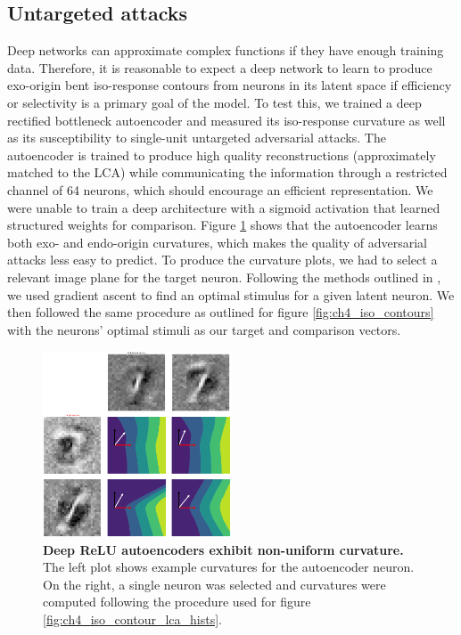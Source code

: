 \subsection{Untargeted attacks}\label{sec:ch4_deep_relu_comparisons}
Deep networks can approximate complex functions if they have enough training data. Therefore, it is reasonable to expect a deep network to learn to produce exo-origin bent iso-response contours from neurons in its latent space if efficiency or selectivity is a primary goal of the model. To test this, we trained a deep rectified bottleneck autoencoder and measured its iso-response curvature as well as its susceptibility to single-unit untargeted adversarial attacks. The autoencoder is trained to produce high quality reconstructions (approximately matched to the LCA) while communicating the information through a restricted channel of 64 neurons, which should encourage an efficient representation. We were unable to train a deep architecture with a sigmoid activation that learned structured weights for comparison. Figure \ref{fig:ch4_drae_curvature} shows that the autoencoder learns both exo- and endo-origin curvatures, which makes the quality of adversarial attacks less easy to predict. To produce the curvature plots, we had to select a relevant image plane for the target neuron. Following the methods outlined in \parencite{mahendran2016visualizing}, we used gradient ascent to find an optimal stimulus for a given latent neuron. We then followed the same procedure as outlined for figure \ref{fig:ch4_iso_contours} with the neurons' optimal stimuli as our target and comparison vectors.

\begin{figure}
    \centering
    \includegraphics[width=0.5\textwidth]{figures/drae_deep_curvature.png}
    \caption{\textbf{Deep ReLU autoencoders exhibit non-uniform curvature.} The left plot shows example curvatures for the autoencoder neuron. On the right, a single neuron was selected and curvatures were computed following the procedure used for figure \ref{fig:ch4_iso_contour_lca_hists}.}
    \label{fig:ch4_drae_curvature}
\end{figure}


